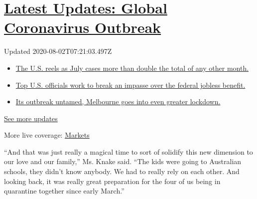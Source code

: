 \hypertarget{latest-updates-global-coronavirus-outbreak}{%
\section{\texorpdfstring{\href{https://www.nytimes.com/2020/08/01/world/coronavirus-covid-19.html?action=click\&pgtype=Article\&state=default\&region=MAIN_CONTENT_1\&context=storylines_live_updates}{Latest
Updates: Global Coronavirus
Outbreak}}{Latest Updates: Global Coronavirus Outbreak}}\label{latest-updates-global-coronavirus-outbreak}}

Updated 2020-08-02T07:21:03.497Z

\begin{itemize}
\tightlist
\item
  \href{https://www.nytimes.com/2020/08/01/world/coronavirus-covid-19.html?action=click\&pgtype=Article\&state=default\&region=MAIN_CONTENT_1\&context=storylines_live_updates\#link-34047410}{The
  U.S. reels as July cases more than double the total of any other
  month.}
\item
  \href{https://www.nytimes.com/2020/08/01/world/coronavirus-covid-19.html?action=click\&pgtype=Article\&state=default\&region=MAIN_CONTENT_1\&context=storylines_live_updates\#link-780ec966}{Top
  U.S. officials work to break an impasse over the federal jobless
  benefit.}
\item
  \href{https://www.nytimes.com/2020/08/01/world/coronavirus-covid-19.html?action=click\&pgtype=Article\&state=default\&region=MAIN_CONTENT_1\&context=storylines_live_updates\#link-2bc8948}{Its
  outbreak untamed, Melbourne goes into even greater lockdown.}
\end{itemize}

\href{https://www.nytimes.com/2020/08/01/world/coronavirus-covid-19.html?action=click\&pgtype=Article\&state=default\&region=MAIN_CONTENT_1\&context=storylines_live_updates}{See
more updates}

More live coverage:
\href{https://www.nytimes.com/live/2020/07/31/business/stock-market-today-coronavirus?action=click\&pgtype=Article\&state=default\&region=MAIN_CONTENT_1\&context=storylines_live_updates}{Markets}

``And that was just really a magical time to sort of solidify this new
dimension to our love and our family,'' Ms. Knake said. ``The kids were
going to Australian schools, they didn't know anybody. We had to really
rely on each other. And looking back, it was really great preparation
for the four of us being in quarantine together since early March.''

